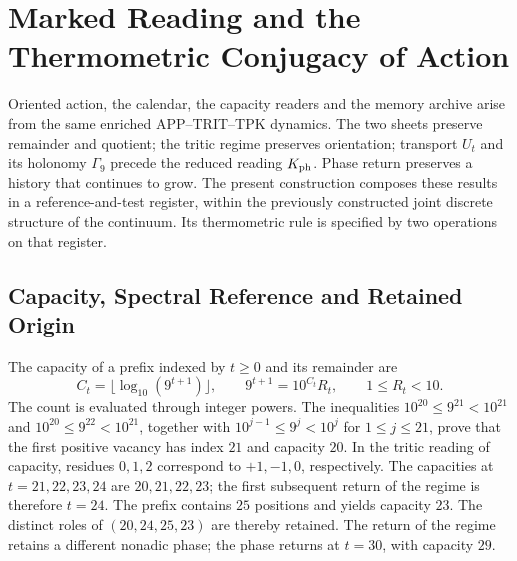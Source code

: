 \section{Marked Reading and the Thermometric Conjugacy of Action}
\label{md:r27:termica}

Oriented action, the calendar, the capacity readers and the memory archive
arise from the same enriched APP--TRIT--TPK dynamics. The two sheets preserve
remainder and quotient; the tritic regime preserves orientation; transport
$U_t$ and its holonomy $\Gamma_9$ precede the reduced reading $K_{\rm ph}$.
Phase return preserves a history that continues to grow. The present
construction composes these results in a reference-and-test register, within
the previously constructed joint discrete structure of the continuum.
Its thermometric rule is specified by two operations on that register.

\subsection{Capacity, Spectral Reference and Retained Origin}
\label{md:r27:capacidad}
The capacity of a prefix indexed by $t\ge0$ and its remainder are
\begin{equation}
 C_t=\lfloor\log_{10}(9^{t+1})\rfloor,\qquad
 9^{t+1}=10^{C_t}R_t,\qquad 1\le R_t<10.
 \label{md:r27:capacidad-resto}
\end{equation}
The count is evaluated through integer powers. The inequalities
$10^{20}\le9^{21}<10^{21}$ and $10^{20}\le9^{22}<10^{21}$,
together with $10^{j-1}\le9^j<10^j$ for $1\le j\le21$, prove that
the first positive vacancy has index $21$ and capacity $20$.
In the tritic reading of capacity, residues $0,1,2$ correspond to
$+1,-1,0$, respectively. The capacities at $t=21,22,23,24$ are
$20,21,22,23$; the first subsequent return of the regime is therefore
$t=24$. The prefix contains $25$ positions and yields capacity $23$.
The distinct roles of $(20,24,25,23)$ are thereby retained.
The return of the regime retains a different nonadic phase; the phase returns
at $t=30$, with capacity $29$.

